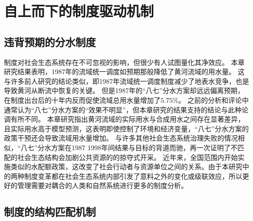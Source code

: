 \section{自上而下的制度驱动机制}

\subsection{违背预期的分水制度}

制度对社会\textendash{}生态系统存在不可忽视的影响，但很少有人试图量化其净效应\cite{cumming2020a}。
本章研究结果表明，1987年的流域统一调度如预期那般降低了黄河流域的用水量。
这与许多前人研究的结论类似，即1987年流域统一调度制度减少了地表水竞争，也是导致黄河从断流中恢复的关键\cite{chen2021,huangang2002,an2007}。
但是1987年的``八七''分水方案却远远偏离预期，在制度出台后的十年内反而促使流域总用水量增加了$5.75\%$。
之前的分析和评论中通常认为``八七''分水方案的“效果不明显”，但本章研究的结果支持的结论与此种论调有所不同。
本章研究指出黄河流域的实际用水与合成用水之间存在显著差异，且实际用水高于模型预测\cite{abadie2015,hill2021}，这表明即使控制了环境和经济变量，``八七''分水方案的政策干预还会导致流域用水量增加。
与许多其他社会生态系统治理失败的情况相似，``八七''分水方案在1987 \textendash{} 1998年间结果与目标的背道而驰，再一次证明了不匹配的社会生态结构会加剧公共资源的的掠夺式开采\cite{kellenberg2009,cai2016,barnes2019}。
近年来，全国范围内开始实施类似的水配额政策，这改变了社会行动者与资源单位之间的关系。由于本研究中的两种制度变革都在社会\textendash{}生态系统内部引发了意料之外的变化或级联效应，所以更好的管理需要对耦合的人类和自然系统进行更多的制度分析。

%
\subsection{制度的结构匹配机制}

